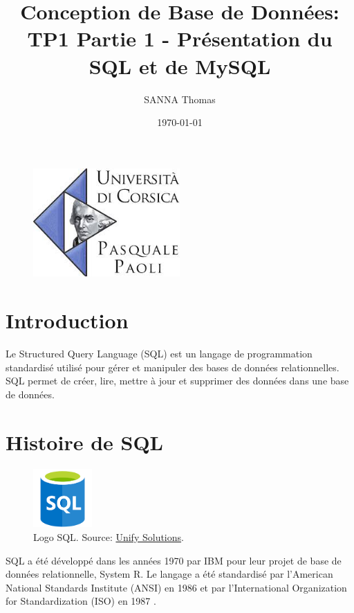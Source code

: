 \documentclass{article}
\title{Conception de Base de Données: \\ TP1 Partie 1 - Présentation du SQL et de MySQL}
\author{SANNA Thomas}
\date{\today}
\begin{document}
\begin{figure}
    \centering
    \includegraphics[width=0.5\textwidth]{img/logoUniv.jpg}
    \label{fig:univ-logo}
\end{figure}

\maketitle

\break\tableofcontents

\break\section{Introduction}
Le Structured Query Language (SQL) est un langage de programmation standardisé utilisé pour gérer et manipuler des bases de données relationnelles. SQL permet de créer, lire, mettre à jour et supprimer des données dans une base de données.

\section{Histoire de SQL}

\begin{figure}[H]
  \centering
  \includegraphics[width=0.2\textwidth]{img/logoSQL.png}
  \caption{Logo SQL. Source: \href{https://unifysolutions.net/supportedproduct/microsoft-sql-server/}{Unify Solutions}.}
  \label{fig:sql-logo}
\end{figure}

SQL a été développé dans les années 1970 par IBM pour leur projet de base de données relationnelle, System R. Le langage a été standardisé par l'American National Standards Institute (ANSI) en 1986 et par l'International Organization for Standardization (ISO) en 1987 \cite{aws}. 
\end{document}

